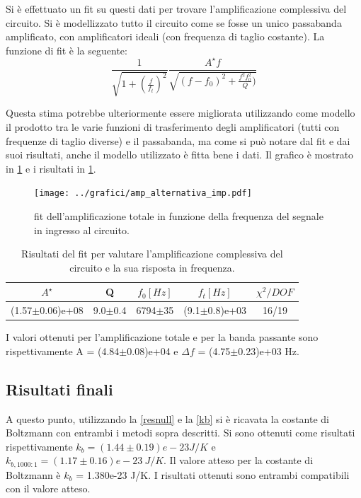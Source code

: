 \documentclass[a4paper,10pt]{article}
\begin{document}
Si è effettuato un fit su questi dati per trovare l'amplificazione complessiva del circuito. Si è modellizzato tutto il circuito come se fosse un unico passabanda amplificato, con amplificatori ideali (con frequenza di taglio costante). La funzione di fit è la seguente:
\begin{equation}
\frac{1}{\sqrt{1+(\frac{f}{f_t})^2}} \frac{A^\star f}{\sqrt{(f - f_0)^2+ \frac{f^2 f_0^2}{Q} )}}
\end{equation}

Questa stima potrebbe ulteriormente essere migliorata utilizzando come modello il prodotto tra le varie funzioni di trasferimento degli amplificatori (tutti con frequenze di taglio diverse) e il passabanda, ma come si può notare dal fit e dai suoi risultati, anche il modello utilizzato è fitta bene i dati. Il grafico è mostrato in \cref{fig:ampltot} e i risultati in \cref{tab:risult}.

\begin{figure}[H]
	\centering
	\texttt{[image: ../grafici/amp\_alternativa\_imp.pdf]}
	\caption{fit dell'amplificazione totale in funzione della frequenza del segnale in ingresso al circuito.}
	\label{fig:ampltot}
\end{figure}

\begin{table}[H]
	\centering
	\begin{tabular}{c|c|c|c|c}
	$A^\star$ & Q & $f_0[Hz]$ & $f_t[Hz]$ & $\chi^2/DOF$ \\
	\hline
	(1.57$\pm$0.06)e+08 & 9.0$\pm$0.4 & 6794$\pm$35 & (9.1$\pm$0.8)e+03 & 16/19 \\
	\end{tabular}
	\caption{Risultati del fit per valutare l'amplificazione complessiva del circuito e la sua risposta in frequenza.}
	\label{tab:risult}
\end{table}

I valori ottenuti per l'amplificazione totale e per la banda passante sono rispettivamente A = (4.84$\pm$0.08)e+04 e $\Delta f$ = (4.75$\pm$0.23)e+03 Hz.



\subsection{Risultati finali}
A questo punto, utilizzando la \eqref{resnull} e la \eqref{kb} si è ricavata la costante di Boltzmann con entrambi i metodi sopra descritti. Si sono ottenuti come risultati rispettivamente $k_b = (1.44\pm0.19)e-23 J/K$ e $k_{b,1000:1} = (1.17\pm0.16)e-23~J/K $. Il valore atteso per la costante di Boltzmann è $k_b$ = 1.380e-23 J/K. I risultati ottenuti sono entrambi compatibili con il valore atteso. 
\end{document}
